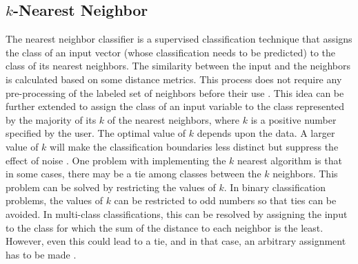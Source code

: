 \subsection{$k$-Nearest Neighbor}
The nearest neighbor classifier is a supervised classification technique that assigns the class of an input vector (whose classification needs to be predicted) to the class of its nearest neighbors. The similarity between the input and the neighbors is calculated based on some distance metrics. This process does not require any pre-processing of the labeled set of neighbors before their use \cite{cover1967}. 
This idea can be further extended to assign the class of an input variable to the class represented by the majority of its $k$ of the nearest neighbors, where $k$ is a positive number specified by the user. 
The optimal value of $k$ depends upon the data. A larger value of $k$ will make the classification boundaries less distinct but suppress the effect of noise \cite{scikit-learn}. One problem with implementing the $k$ nearest algorithm is that in some cases, there may be a tie among classes between the $k$ neighbors. This problem can be solved by restricting the values of $k$. In binary classification problems, the values of $k$ can be restricted to odd numbers so that ties can be avoided. In multi-class classifications, this can be resolved by assigning the input to the class for which the sum of the distance to each neighbor is the least. However, even this could lead to a tie, and in that case, an arbitrary assignment has to be made \cite{keller1985}.

